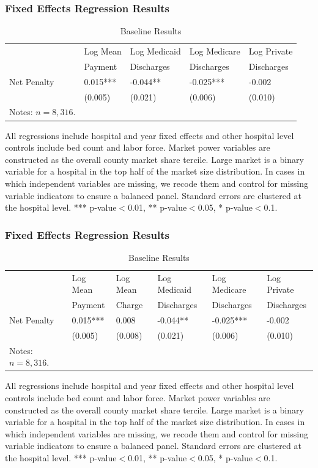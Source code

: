 \documentclass[ucs,9pt]{beamer}
\begin{document}
\begin{frame}
\frametitle{Fixed Effects Regression Results}
\begin{table}[htp]
\centering \normalsize
\caption{Baseline Results}
\label{tab:samplemort}
\footnotesize
\begin{tabular}{lllll}
\hline	
 			& Log Mean				& Log Medicaid 	   	& Log Medicare   		& Log Private  			\\
			& Payment				& Discharges      		& Discharges       		& Discharges        	\\
\hline
Net Penalty  	&	0.015***		&	-0.044**	&	-0.025***	&	-0.002	\\
	&	(0.005)		&	(0.021)	&	(0.006)	&	(0.010)	\\
\hline
\tiny Notes: $n=8,316$.  
\end{tabular}
\end{table}
\tiny All regressions include hospital and year fixed effects and other hospital level controls include bed count and labor force.  Market power variables are constructed as the overall county market share tercile.  Large market is a binary variable for a hospital in the top half of the market size distribution.  In cases in which independent variables are missing, we recode them and control for missing variable indicators to ensure a balanced panel.  Standard errors are clustered at the hospital level.  *** p-value$<$0.01, ** p-value$<$0.05, * p-value$<$0.1.
\end{frame}

\begin{frame}
\frametitle{Fixed Effects Regression Results}
\begin{table}[htp]
\centering \normalsize
\caption{Baseline Results}
\label{tab:samplemort}
\footnotesize
\begin{tabular}{llllll}
\hline	
 			& Log Mean		& Log Mean		& Log Medicaid 	   	& Log Medicare   		& Log Private  			\\
			& Payment		& 	Charge		& Discharges      		& Discharges       		& Discharges        	\\
\hline
Net Penalty  	&	0.015***	&	0.008	&	-0.044**	&	-0.025***	&	-0.002	\\
	&	(0.005)	&	(0.008)	&	(0.021)	&	(0.006)	&	(0.010)	\\
\hline
\tiny Notes: $n=8,316$.  
\end{tabular}
\end{table}
\tiny All regressions include hospital and year fixed effects and other hospital level controls include bed count and labor force.  Market power variables are constructed as the overall county market share tercile.  Large market is a binary variable for a hospital in the top half of the market size distribution.  In cases in which independent variables are missing, we recode them and control for missing variable indicators to ensure a balanced panel.  Standard errors are clustered at the hospital level.  *** p-value$<$0.01, ** p-value$<$0.05, * p-value$<$0.1.
\end{frame}
\end{document}
